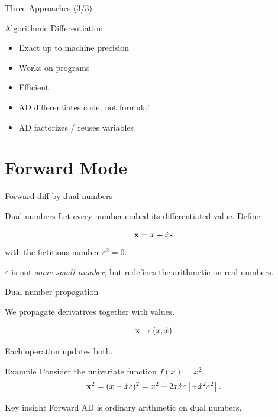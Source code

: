 \documentclass[12pt,xcolor={table}]{beamer}
\newcommand{\xbf}{{\bf x}}
\begin{document}
\begin{frame}{Three Approaches (3/3)}
\begin{block}{Algorithmic Differentiation}
\begin{itemize}
\item Exact up to machine precision
\item Works on programs
\item Efficient
\end{itemize}
\end{block}

\begin{block}

\begin{itemize}
\item AD differentiates code, not formula!
\item AD factorizes / reuses variables
\end{itemize}

\end{block}

\end{frame}

\section{Forward Mode}

\begin{frame}{Forward diff by dual numbers}

\begin{block}{Dual numbers}
Let every number embed its differentiated value. 
Define:

\[
\xbf = x + \dot{x}\varepsilon
\]
with the fictitious number $\varepsilon^2 = 0$.
\end{block}

$\varepsilon$ is not \emph{some small number}, but redefines the arithmetic on real numbers.

\end{frame}

\begin{frame}{Dual number propagation}

We propagate derivatives together with values.

\[
\xbf \rightarrow (x, \dot{x})
\]

Each operation updates both.

\pause

\begin{block}{Example}
Consider the univariate function $f(x) = x^2$.
\[
\xbf^2 = (x + \dot{x}\varepsilon)^2
= x^2 + 2x\dot{x}\varepsilon \left[ + \dot{x}^2 \varepsilon^2 \right].
\]

\end{block}

\begin{block}{Key insight}
Forward AD is ordinary arithmetic on dual numbers.
\end{block}

\end{frame}
\end{document}
